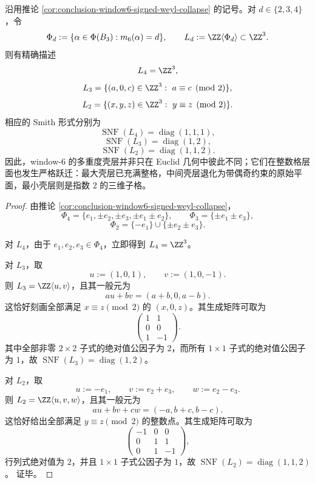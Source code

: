 \begin{theorem}\label{thm:conclusion-window6-multiplicity-shell-smith-geometry}
沿用推论 \ref{cor:conclusion-window6-signed-weyl-collapse} 的记号。对 \(d\in\{2,3,4\}\)，令
\[
\Phi_d:=\{\alpha\in\Phi(B_3):m_6(\alpha)=d\},
\qquad
L_d:=\ZZ\langle \Phi_d\rangle\subset \ZZ^3.
\]
则有精确描述
\[
L_4=\ZZ^3,
\]
\[
L_3=\{(a,0,c)\in\ZZ^3:\ a\equiv c\pmod 2\},
\]
\[
L_2=\{(x,y,z)\in\ZZ^3:\ y\equiv z\pmod 2\}.
\]
相应的 Smith 形式分别为
\[
\operatorname{SNF}(L_4)=\operatorname{diag}(1,1,1),
\]
\[
\operatorname{SNF}(L_3)=\operatorname{diag}(1,2),
\]
\[
\operatorname{SNF}(L_2)=\operatorname{diag}(1,1,2).
\]
因此，window-\(6\) 的多重度壳层并非只在 Euclid 几何中彼此不同；它们在整数格层面也发生严格跃迁：最大壳层已充满整格，中间壳层退化为带偶奇约束的原始平面，最小壳层则是指数 \(2\) 的三维子格。
\end{theorem}
\begin{proof}
由推论 \ref{cor:conclusion-window6-signed-weyl-collapse}，
\[
\Phi_4=\{e_1,\pm e_2,\pm e_3,\pm e_1\pm e_2\},
\qquad
\Phi_3=\{\pm e_1\pm e_3\},
\]
\[
\Phi_2=\{-e_1\}\cup\{\pm e_2\pm e_3\}.
\]

对 \(L_4\)，由于 \(e_1,e_2,e_3\in\Phi_4\)，立即得到 \(L_4=\ZZ^3\)。

对 \(L_3\)，取
\[
u:=(1,0,1),\qquad v:=(1,0,-1).
\]
则 \(L_3=\ZZ\langle u,v\rangle\)，且其一般元为
\[
au+bv=(a+b,0,a-b).
\]
这恰好刻画全部满足 \(x\equiv z\pmod 2\) 的 \((x,0,z)\)。其生成矩阵可取为
\[
\begin{pmatrix}
1&1\\
0&0\\
1&-1
\end{pmatrix}.
\]
其中全部非零 \(2\times 2\) 子式的绝对值公因子为 \(2\)，而所有 \(1\times 1\) 子式的绝对值公因子为 \(1\)，故
\(
\operatorname{SNF}(L_3)=\operatorname{diag}(1,2)
\)。

对 \(L_2\)，取
\[
u:=-e_1,\qquad v:=e_2+e_3,\qquad w:=e_2-e_3.
\]
则 \(L_2=\ZZ\langle u,v,w\rangle\)，且其一般元为
\[
au+bv+cw=(-a,b+c,b-c).
\]
这恰好给出全部满足 \(y\equiv z\pmod 2\) 的整数点。其生成矩阵可取为
\[
\begin{pmatrix}
-1&0&0\\
0&1&1\\
0&1&-1
\end{pmatrix},
\]
行列式绝对值为 \(2\)，并且 \(1\times 1\) 子式公因子为 \(1\)，故
\(
\operatorname{SNF}(L_2)=\operatorname{diag}(1,1,2)
\)。
证毕。
\end{proof}

